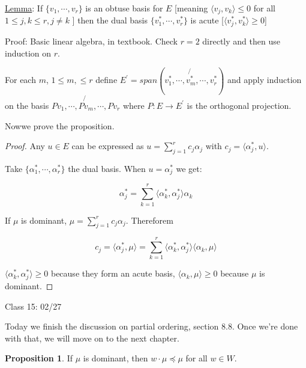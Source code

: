 \documentclass{article}
\theoremstyle{definition}
\newtheorem{proposition}{Proposition}
\begin{document}
\underline{Lemma}: If \(\{ v_1, \cdots, v_r \} \) is an obtuse basis for \(E\) [meaning \(\langle v_j, v_k \rangle \leq 0\) for all \(1\leq j,k\leq r, j \neq k\) ] then the dual basis \(\{ v_1^{\ast} , \cdots , v_r^{\ast}  \} \) is acute [\(\langle v_j^{\ast} , v_k^{\ast}  \rangle \geq 0\)]

Proof: Basic linear algebra, in textbook. Check \(r = 2\) directly and then use induction on \(r\).

For each \(m\), \(1 \leq m, \leq r\) define \(E^{\prime} = span(v_1^{\ast} , \cdots, \not{v_m^{\ast}}, \cdots,v_r ^{\ast})\) and apply induction on the basis \(Pv_1, \cdots , \not{P v_m},\cdots, Pv_r\) where \(P:E \to E^{\prime}\) is the orthogonal projection.

Nowwe prove the proposition.

\begin{proof}
    Any \(u\in E\) can be expressed as \(u = \sum_{j=1}^{r} c_j \alpha_j\) with \(c_j = \langle \alpha_j ^{\ast}, u \rangle \).

    Take \(\{ \alpha_1 ^{\ast} , \cdots, \alpha_r ^{\ast} \} \) the dual basis. When \(u = \alpha_j ^{\ast}\) we get:

    \[
        \alpha_j ^{\ast} = \sum_{k=1}^{r} \langle \alpha_k ^{\ast} , \alpha_j ^{\ast}  \rangle \alpha_k
    \]

    If \(\mu\) is dominant, \(\mu = \sum_{j=1}^{r} c_j \alpha _j\). Thereforem

    \[
        c_j = \langle \alpha_j ^{\ast},\mu \rangle = \sum_{k=1}^{r} \langle \alpha_k ^{\ast} , \alpha_j ^{\ast}  \rangle \langle \alpha_k, \mu  \rangle 
    \]

    \(\langle \alpha_k ^{\ast} , \alpha_j ^{\ast}  \rangle \geq 0\) because they form an acute basis, \(\langle \alpha_k, \mu \rangle \geq 0\) because \(\mu\) is dominant.

\end{proof}

\hrulefill

Class 15: 02/27

Today we finish the discussion on partial ordering, section 8.8. Once we're done with that, we will move on to the next chapter.

\begin{proposition}
    If \(\mu\) is dominant, then \(w \cdot \mu \preceq \mu\) for all \(w\in W\).
\end{proposition}
\end{document}
